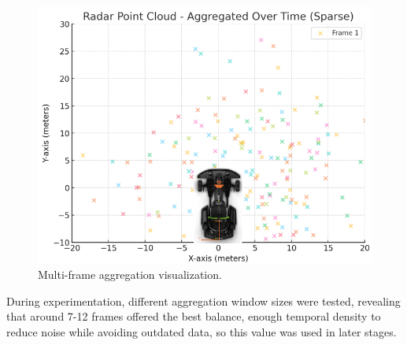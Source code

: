\begin{figure}[!htbp]
    \centering
    \includegraphics[width=0.5\linewidth]{images/multiframe.png}
    \caption{Multi-frame aggregation visualization.}
    \label{fig:multiframe}
\end{figure}

During experimentation, different aggregation window sizes were tested, revealing that around 7-12 frames offered the best balance, enough temporal density to reduce noise while avoiding outdated data, so this value was used in later stages.
